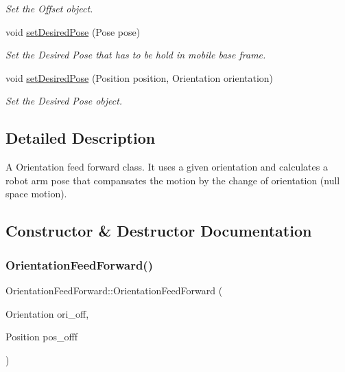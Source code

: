 \begin{DoxyCompactItemize}
\begin{DoxyCompactList}\small\item\em Set the Offset object. \end{DoxyCompactList}\item 
void \hyperlink{classOrientationFeedForward_a5f69dfd449972707d2ccd07e20fd2c5b}{set\+Desired\+Pose} (Pose pose)
\begin{DoxyCompactList}\small\item\em Set the Desired Pose that has to be hold in mobile base frame. \end{DoxyCompactList}\item 
void \hyperlink{classOrientationFeedForward_ad419aebf0df88282ca6c1dc24adbadb2}{set\+Desired\+Pose} (Position position, Orientation orientation)
\begin{DoxyCompactList}\small\item\em Set the Desired Pose object. \end{DoxyCompactList}\end{DoxyCompactItemize}


\subsection{Detailed Description}
A Orientation feed forward class. It uses a given orientation and calculates a robot arm pose that compansates the motion by the change of orientation (null space motion). 

\subsection{Constructor \& Destructor Documentation}
\mbox{\label{classOrientationFeedForward_a8b4fc8cb74ff3ab16db1a7ed706789aa}} 
\subsubsection{\texorpdfstring{Orientation\+Feed\+Forward()}{OrientationFeedForward()}}
{\footnotesize\ttfamily Orientation\+Feed\+Forward\+::\+Orientation\+Feed\+Forward (\begin{DoxyParamCaption}\item[{Orientation}]{ori\+\_\+off,  }\item[{Position}]{pos\+\_\+offf }\end{DoxyParamCaption})}



